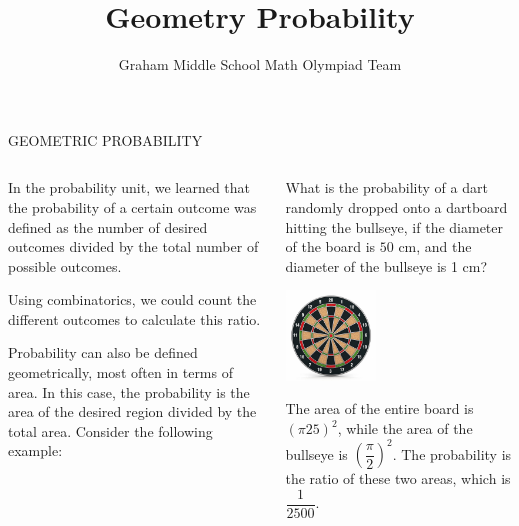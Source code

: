 \documentclass[9pt,aspectratio=169]{beamer}
\title{Geometry Probability}
\subtitle[Graham Middle School]{Graham Middle School Math Olympiad Team}
\begin{document}
\maketitle

\begin{frame}{GEOMETRIC PROBABILITY}
  \begin{columns}[T]
    \begin{column}{0.5\textwidth}
      In the probability unit, we learned that the probability of a certain outcome was defined as the number of desired outcomes divided by the total number of possible outcomes.
      
      Using combinatorics, we could count the different outcomes to calculate this ratio.
      
      Probability can also be defined geometrically, most often in terms of area.  In this case, the probability is the area of the desired region divided by the total area.  Consider the following example:

    \end{column}
    \begin{column}{0.5\textwidth}
      \begin{problem}
        What is the probability of a dart randomly dropped onto a dartboard hitting the bullseye, if the diameter of the board is $50$ cm, and the diameter of the bullseye is 1 cm?
      \end{problem}
      \begin{center}
        \includegraphics[width=0.4\textwidth]{16 - Geometric Probability/darts.png}
      \end{center}
      The area of the entire board is $(\pi 25)^2$, while the area of the bullseye is $\left(\dfrac{\pi}{2}\right)^2$.  The probability is the ratio of these two areas, which is $\dfrac{1}{2500}$.

    \end{column}
  \end{columns}
\end{frame}
\end{document}
